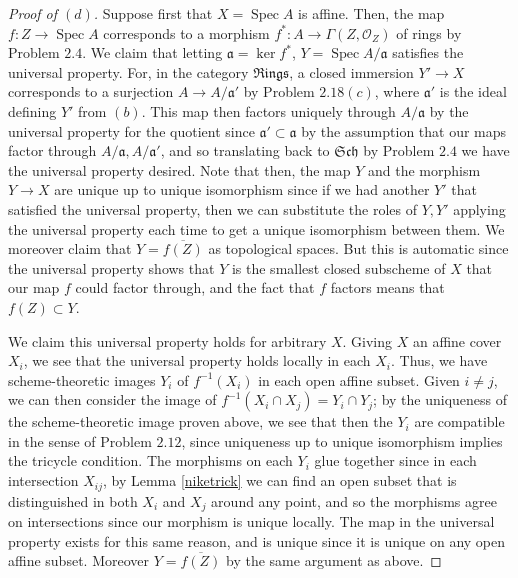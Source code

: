 \documentclass[12pt,letterpaper]{article}
\theoremstyle{definition}
\theoremstyle{remark}
\numberwithin{equation}{section}
\numberwithin{figure}{problem}
\DeclareMathOperator{\Spec}{Spec}
\newcommand{\OO}{\mathcal{O}}
\newcommand{\red}{\mathrm{red}}
\newcommand{\Sch}{\mathfrak{Sch}}
\newcommand{\Rings}{\mathfrak{Rings}}
\begin{document}
\begin{proof}[Proof of $(d)$]
  Suppose first that $X = \Spec A$ is affine. Then, the map $f\colon Z \to \Spec A$ corresponds to a morphism $f^*\colon A \to \Gamma(Z,\OO_Z)$ of rings by Problem $2.4$. We claim that letting $\mathfrak{a} = \ker f^*$, $Y = \Spec A/\mathfrak{a}$ satisfies the universal property. For, in the category $\Rings$, a closed immersion $Y' \to X$ corresponds to a surjection $A \to A/\mathfrak{a}'$ by Problem $2.18(c)$, where $\mathfrak{a}'$ is the ideal defining $Y'$ from $(b)$. This map then factors uniquely through $A/\mathfrak{a}$ by the universal property for the quotient since $\mathfrak{a}'\subset\mathfrak{a}$ by the assumption that our maps factor through $A/\mathfrak{a},A/\mathfrak{a}'$, and so translating back to $\Sch$ by Problem $2.4$ we have the universal property desired. Note that then, the map $Y$ and the morphism $Y \to X$ are unique up to unique isomorphism since if we had another $Y'$ that satisfied the universal property, then we can substitute the roles of $Y,Y'$ applying the universal property each time to get a unique isomorphism between them. We moreover claim that $Y = \overline{f(Z)}$ as topological spaces. But this is automatic since the universal property shows that $Y$ is the smallest closed subscheme of $X$ that our map $f$ could factor through, and the fact that $f$ factors means that $f(Z) \subset Y$.
  \par We claim this universal property holds for arbitrary $X$. Giving $X$ an affine cover $X_i$, we see that the universal property holds locally in each $X_i$. Thus, we have scheme-theoretic images $Y_i$ of $f^{-1}(X_i)$ in each open affine subset. Given $i \ne j$, we can then consider the image of $f^{-1}(X_i \cap X_j) = Y_i \cap Y_j$; by the uniqueness of the scheme-theoretic image proven above, we see that then the $Y_i$ are compatible in the sense of Problem $2.12$, since uniqueness up to unique isomorphism implies the tricycle condition. The morphisms on each $Y_i$ glue together since in each intersection $X_{ij}$, by Lemma \ref{niketrick} we can find an open subset that is distinguished in both $X_i$ and $X_j$ around any point, and so the morphisms agree on intersections since our morphism is unique locally. The map in the universal property exists for this same reason, and is unique since it is unique on any open affine subset. Moreover $Y = \overline{f(Z)}$ by the same argument as above.

\end{proof}
\end{document}
